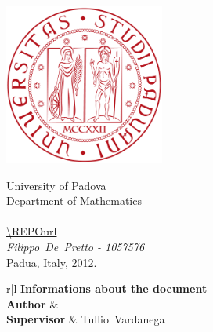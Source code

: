 \documentclass[a4paper,11pt]{article}
\def\ME				{\mbox{Filippo De Pretto}}
\def\SERIAL			{\mbox{1057576}}
\def\SUPERVISOR		{\mbox{Tullio Vardanega}}
\def\END			{Padua, Italy, 2012.}
\def\PROJECTurl {\url{\REPOurl}}
\begin{document}
		
\thispagestyle{empty}

\begin{center}

\includegraphics[height=200px]{img/unipd_logo.png}

\vspace{0.5cm}
{\Huge University of Padova}\\[.5pc]
{\Large Department of Mathematics}\\[.5pc]
\vspace{5 mm}
{\Huge \textbf{\PROJECT{}}}\\[.5pc]
{\Large \PROJECTurl}\\[.5pc]
{\Large \emph{\ME{} - \SERIAL{}}}\\[1pc]


\vspace{0.5cm}
{\Large \END}\\[3pc]

\normalsize{
	\begin{tabular}{r|l}
		 {\textbf{Informations about the document}} \\
		\midrule
		\textbf{Author} 				& \AUTHOR \\
		\textbf{Supervisor} 			& \SUPERVISOR \\
	\end{tabular}
}

\end{center}

\newpage
\end{document}
